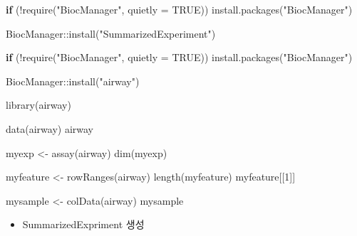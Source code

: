 \documentclass[
]{book}
\newenvironment{Shaded}{\begin{snugshade}}{\end{snugshade}}
\newcommand{\AttributeTok}[1]{\textcolor[rgb]{0.77,0.63,0.00}{#1}}
\newcommand{\ConstantTok}[1]{\textcolor[rgb]{0.00,0.00,0.00}{#1}}
\newcommand{\ControlFlowTok}[1]{\textcolor[rgb]{0.13,0.29,0.53}{\textbf{#1}}}
\newcommand{\DecValTok}[1]{\textcolor[rgb]{0.00,0.00,0.81}{#1}}
\newcommand{\FunctionTok}[1]{\textcolor[rgb]{0.00,0.00,0.00}{#1}}
\newcommand{\NormalTok}[1]{#1}
\newcommand{\OtherTok}[1]{\textcolor[rgb]{0.56,0.35,0.01}{#1}}
\newcommand{\SpecialCharTok}[1]{\textcolor[rgb]{0.00,0.00,0.00}{#1}}
\newcommand{\StringTok}[1]{\textcolor[rgb]{0.31,0.60,0.02}{#1}}
\providecommand{\tightlist}{%
  \setlength{\itemsep}{0pt}\setlength{\parskip}{0pt}}
\begin{document}
\begin{Shaded}
\begin{Highlighting}[]
\ControlFlowTok{if}\NormalTok{ (}\SpecialCharTok{!}\FunctionTok{require}\NormalTok{(}\StringTok{"BiocManager"}\NormalTok{, }\AttributeTok{quietly =} \ConstantTok{TRUE}\NormalTok{))}
    \FunctionTok{install.packages}\NormalTok{(}\StringTok{"BiocManager"}\NormalTok{)}

\NormalTok{BiocManager}\SpecialCharTok{::}\FunctionTok{install}\NormalTok{(}\StringTok{"SummarizedExperiment"}\NormalTok{)}
\end{Highlighting}
\end{Shaded}

\begin{Shaded}
\begin{Highlighting}[]
\ControlFlowTok{if}\NormalTok{ (}\SpecialCharTok{!}\FunctionTok{require}\NormalTok{(}\StringTok{"BiocManager"}\NormalTok{, }\AttributeTok{quietly =} \ConstantTok{TRUE}\NormalTok{))}
    \FunctionTok{install.packages}\NormalTok{(}\StringTok{"BiocManager"}\NormalTok{)}

\NormalTok{BiocManager}\SpecialCharTok{::}\FunctionTok{install}\NormalTok{(}\StringTok{"airway"}\NormalTok{)}
\end{Highlighting}
\end{Shaded}

\begin{Shaded}
\begin{Highlighting}[]
\FunctionTok{library}\NormalTok{(airway)}

\FunctionTok{data}\NormalTok{(airway)}
\NormalTok{airway}

\NormalTok{myexp }\OtherTok{\textless{}{-}} \FunctionTok{assay}\NormalTok{(airway)}
\FunctionTok{dim}\NormalTok{(myexp)}

\NormalTok{myfeature }\OtherTok{\textless{}{-}} \FunctionTok{rowRanges}\NormalTok{(airway)}
\FunctionTok{length}\NormalTok{(myfeature)}
\NormalTok{myfeature[[}\DecValTok{1}\NormalTok{]]}


\NormalTok{mysample }\OtherTok{\textless{}{-}} \FunctionTok{colData}\NormalTok{(airway)}
\NormalTok{mysample}
\end{Highlighting}
\end{Shaded}

\begin{itemize}
\tightlist
\item
  SummarizedExpriment 생성
\end{itemize}
\end{document}
